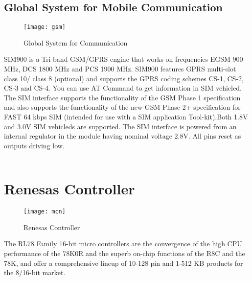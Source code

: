 \documentclass[12pt,a4paper]{report}
\begin{document}
\subsection{Global System for Mobile Communication}
\begin{figure}[H]
		\begin{center}
			\texttt{[image: gsm]}
			\caption{Global System for Communication}
			\end{center}
	\end{figure}

\hspace{0.5cm} SIM900 is a Tri-band GSM/GPRS engine that works on frequencies EGSM 900 MHz, DCS 1800 MHz and PCS 1900 MHz. SIM900 features GPRS multi-slot class 10/ class 8 (optional) and supports the GPRS coding schemes CS-1, CS-2, CS-3 and CS-4. You can use AT Command to get information in SIM vehicled. The SIM interface supports the functionality of the GSM Phase 1 specification and also supports the functionality of the new GSM Phase 2+ specification for FAST 64 kbps SIM (intended for use with a SIM application Tool-kit).Both 1.8V and 3.0V SIM vehicleds are supported. The SIM interface is powered from an internal regulator in the module having nominal voltage 2.8V. All pins reset as outputs driving low. \\\\
\newpage
\section{Renesas Controller}
\begin{figure}[H]
	\begin{center}
		\texttt{[image: mcn]}
		\caption{Renesas Controller}
	\end{center}
\end{figure}
The RL78 Family 16-bit micro controllers are the convergence of the high CPU performance of the 78K0R and the superb on-chip
functions of the R8C and the 78K, and offer a comprehensive lineup
of 10-128 pin and 1-512 KB products for the 8/16-bit market.
\end{document}
